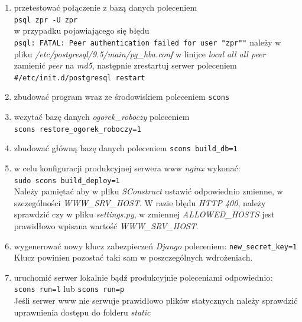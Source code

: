 \begin{enumerate}[resume]
	\item przetestować połączenie z bazą danych poleceniem\\
	\verb|psql zpr -U zpr|\\
	w przypadku pojawiającego się błędu\\
	\verb|psql: FATAL: Peer authentication failed for user "zpr""|
	należy w pliku \textit{/etc/postgresql/9.5/main/pg\_hba.conf} w linijce \textit{local all all peer} zamienić \textit{peer} na \textit{md5}, następnie zrestartuj serwer poleceniem\\
	\verb|#/etc/init.d/postgresql restart|
	
	\item zbudować program wraz ze środowiskiem poleceniem \verb|scons|
	
	\item wczytać bazę danych \textit{ogorek\_roboczy} poleceniem\\
	\verb|scons restore_ogorek_roboczy=1|
	
	\item zbudować główną bazę danych poleceniem \verb|scons build_db=1|
	
	\item w celu konfiguracji produkcyjnej serwera www \textit{nginx} wykonać:\\
	\verb|sudo scons build_deploy=1|\\
	Należy pamiętać aby w pliku \textit{SConstruct} ustawić odpowiednio zmienne, w szczególności \textit{WWW\_SRV\_HOST}.
	W razie błędu \textit{HTTP 400}, należy sprawdzić czy w pliku \textit{settings.py}, w zmiennej \textit{ALLOWED\_HOSTS} jest prawidłowo wpisana wartość \textit{WWW\_SRV\_HOST}.
	
	\item wygenerować nowy klucz zabezpieczeń \textit{Django} poleceniem:
	\verb|new_secret_key=1|\\
	Klucz powinien pozostać taki sam w poszczególnych wdrożeniach.
	
	\item uruchomić serwer lokalnie bądź produkcyjnie poleceniami odpowiednio:\\
	\verb|scons run=l| lub \verb|scons run=p|\\
	Jeśli serwer www nie serwuje prawidłowo plików statycznych należy sprawdzić uprawnienia dostępu do folderu \textit{static}
\end{enumerate}





